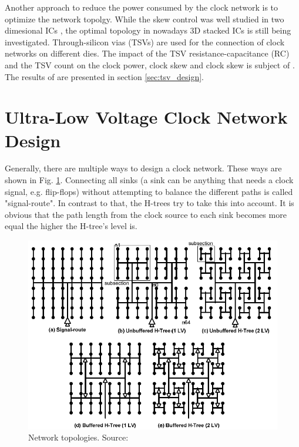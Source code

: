 \documentclass[conference]{IEEEtran}
\begin{document}
Another approach to reduce the power consumed by the clock network is to optimize the network topolgy. While the skew control was well studied in two dimesional ICs \cite{b7}, the optimal topology in nowadays 3D stacked ICs is still being investigated. Through-silicon vias (TSVs) are used for the connection of clock networks on different dies. The impact of the TSV resistance-capacitance (RC) and the TSV count on the clock power, clock skew and clock skew is subject of \cite{b2}. The results of \cite{b2} are presented in section \ref{sec:tsv_design}.

\section{Ultra-Low Voltage Clock Network Design} \label{sec:ulv_design}

Generally, there are multiple ways to design a clock network. These ways are shown in Fig. \ref{fig:network_topologies}. Connecting all sinks (a sink can be anything that needs a clock signal, e.g. flip-flops) without attempting to balance the different paths is called "signal-route". In contrast to that, the H-trees try to take this into account. It is obvious that the path length from the clock source to each sink becomes more equal the higher the H-tree's level is.

\begin{figure}[htbp]
	\includegraphics[width=\linewidth]{img/network_topologies.png}
	\centering
	\caption{Network topologies. Source: \cite{b1}}
	\label{fig:network_topologies}
\end{figure}
\end{document}
